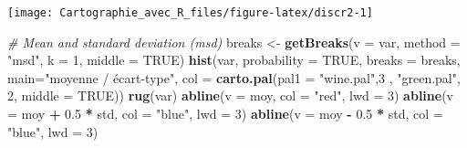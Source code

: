 \documentclass[]{book}
\newenvironment{Shaded}{\begin{snugshade}}{\end{snugshade}}
\newcommand{\KeywordTok}[1]{\textcolor[rgb]{0.13,0.29,0.53}{\textbf{#1}}}
\newcommand{\DataTypeTok}[1]{\textcolor[rgb]{0.13,0.29,0.53}{#1}}
\newcommand{\DecValTok}[1]{\textcolor[rgb]{0.00,0.00,0.81}{#1}}
\newcommand{\FloatTok}[1]{\textcolor[rgb]{0.00,0.00,0.81}{#1}}
\newcommand{\StringTok}[1]{\textcolor[rgb]{0.31,0.60,0.02}{#1}}
\newcommand{\CommentTok}[1]{\textcolor[rgb]{0.56,0.35,0.01}{\textit{#1}}}
\newcommand{\OtherTok}[1]{\textcolor[rgb]{0.56,0.35,0.01}{#1}}
\newcommand{\OperatorTok}[1]{\textcolor[rgb]{0.81,0.36,0.00}{\textbf{#1}}}
\newcommand{\NormalTok}[1]{#1}
\begin{document}
\begin{Shaded}
\end{Shaded}

\begin{center}\texttt{[image: Cartographie\_avec\_R\_files/figure-latex/discr2-1]} \end{center}

\begin{Shaded}
\begin{Highlighting}[]
\CommentTok{# Mean and standard deviation (msd)}
\NormalTok{breaks <-}\StringTok{ }\KeywordTok{getBreaks}\NormalTok{(}\DataTypeTok{v =}\NormalTok{ var, }\DataTypeTok{method =} \StringTok{"msd"}\NormalTok{, }\DataTypeTok{k =} \DecValTok{1}\NormalTok{, }\DataTypeTok{middle =} \OtherTok{TRUE}\NormalTok{)}
\KeywordTok{hist}\NormalTok{(var, }\DataTypeTok{probability =} \OtherTok{TRUE}\NormalTok{, }\DataTypeTok{breaks =}\NormalTok{ breaks, }\DataTypeTok{main=}\StringTok{"moyenne / écart-type"}\NormalTok{,}
     \DataTypeTok{col =} \KeywordTok{carto.pal}\NormalTok{(}\DataTypeTok{pal1 =} \StringTok{"wine.pal"}\NormalTok{,}\DecValTok{3}\NormalTok{ , }\StringTok{"green.pal"}\NormalTok{, }\DecValTok{2}\NormalTok{, }\DataTypeTok{middle =} \OtherTok{TRUE}\NormalTok{))}
\KeywordTok{rug}\NormalTok{(var)}
\KeywordTok{abline}\NormalTok{(}\DataTypeTok{v =}\NormalTok{ moy, }\DataTypeTok{col =} \StringTok{"red"}\NormalTok{, }\DataTypeTok{lwd =} \DecValTok{3}\NormalTok{)}
\KeywordTok{abline}\NormalTok{(}\DataTypeTok{v =}\NormalTok{ moy }\OperatorTok{+}\StringTok{ }\FloatTok{0.5} \OperatorTok{*}\StringTok{ }\NormalTok{std, }\DataTypeTok{col =} \StringTok{"blue"}\NormalTok{, }\DataTypeTok{lwd =} \DecValTok{3}\NormalTok{)}
\KeywordTok{abline}\NormalTok{(}\DataTypeTok{v =}\NormalTok{ moy }\OperatorTok{-}\StringTok{ }\FloatTok{0.5} \OperatorTok{*}\StringTok{ }\NormalTok{std, }\DataTypeTok{col =} \StringTok{"blue"}\NormalTok{, }\DataTypeTok{lwd =} \DecValTok{3}\NormalTok{)}
\end{Highlighting}
\end{Shaded}
\end{document}
